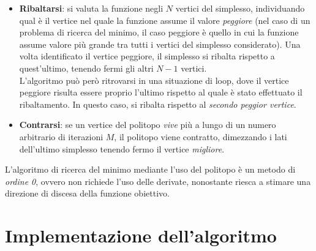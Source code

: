 \documentclass[a4paper, 11pt]{article}
\begin{document}
\begin{itemize}
\item \textbf{Ribaltarsi}: si valuta la funzione negli $N$ vertici del simplesso,
individuando qual è il vertice nel quale la funzione assume il valore
\emph{peggiore} (nel caso di un problema di ricerca del minimo, il caso peggiore
è quello in cui la funzione assume valore più grande tra tutti i vertici del
simplesso considerato). Una volta identificato il vertice peggiore, il simplesso
si ribalta rispetto a quest'ultimo, tenendo fermi gli altri $N-1$ vertici. \\
L'algoritmo può però ritrovarsi in una situazione di loop, dove il vertice
peggiore risulta essere proprio l'ultimo rispetto al quale è stato effettuato il
ribaltamento. In questo caso, si ribalta rispetto al \emph{secondo peggior vertice}. 
\item \textbf{Contrarsi}: se un vertice del politopo \emph{vive} più a lungo di un numero
arbitrario di iterazioni $M$, il politopo viene contratto, dimezzando i lati
dell'ultimo simplesso tenendo fermo il vertice \emph{migliore}.
\end{itemize}

\noindent
L'algoritmo di ricerca del minimo mediante l'uso del politopo è un metodo di
\emph{ordine 0}, ovvero non richiede l'uso delle derivate, nonostante riesca a
stimare una direzione di discesa della funzione obiettivo.

\section*{Implementazione dell'algoritmo}
\end{document}
